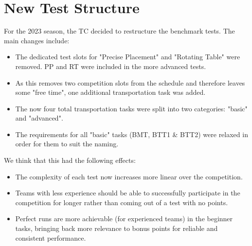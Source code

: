 

\section{New Test Structure}
\label{sec:New Test Structure}

For the 2023 season, the TC decided to restructure the benchmark tests.
The main changes include:

\begin{itemize}
\item The dedicated test slots for "Precise Placement" and "Rotating Table" were removed. 
PP and RT were included in the more advanced tests.
\item As this removes two competition slots from the schedule and therefore leaves some "free time", one additional transportation task was added.
\item The now four total transportation tasks were split into two categories: "basic" and "advanced".
\item The requirements for all "basic" tasks (BMT, BTT1 \& BTT2) were relaxed in order for them to suit the naming.
\end{itemize}

We think that this had the following effects:

\begin{itemize}
\item The complexity of each test now increases more linear over the competition.
\item Teams with less experience should be able to successfully participate in the competition for longer rather than coming out of a test with no points.
\item Perfect runs are more achievable (for experienced teams) in the beginner tasks,
 bringing back more relevance to bonus points for reliable and consistent performance.
\end{itemize}

